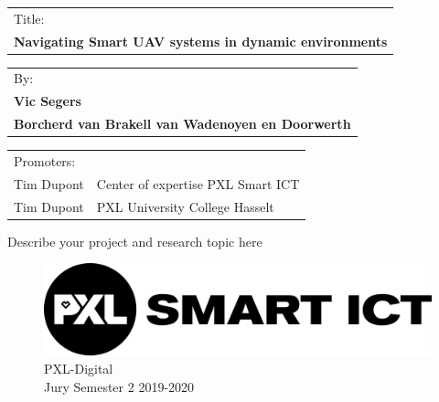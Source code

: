 \documentclass[a4paper]{article}
\begin{document}
  \pagestyle{empty}  %
  \begin{tabularx}{\textwidth}{l}
    Title:\\
    \textbf{Navigating Smart UAV systems in dynamic environments}\\
  \end{tabularx}

  \begin{tabularx}{\textwidth}{l}
    By:\\
    \textbf{Vic Segers}\\
    \textbf{Borcherd van Brakell van Wadenoyen en Doorwerth}\\
  \end{tabularx}

  \begin{tabularx}{\textwidth}{l X}
    Promoters:\\
    Tim Dupont & Center of expertise PXL Smart ICT\\
    Tim Dupont & PXL University College Hasselt\\
    \hline
  \end{tabularx}

  Describe your project and research topic here

  \begin{figure}[!b]
    \centering
    \includegraphics{pxl_smart_ict.png}
    \caption{PXL-Digital\\
    Jury Semester 2 2019-2020}
  \end{figure}
\end{document}
